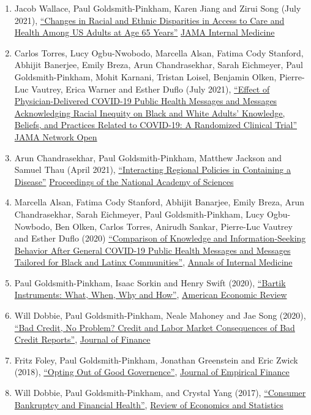\documentclass[letterpaper]{article}
\begin{document}
\begin{enumerate}
\item Jacob Wallace, Paul Goldsmith-Pinkham, Karen Jiang and Zirui Song (July 2021), \href{https://jamanetwork.com/journals/jamainternalmedicine/article-abstract/2782345}{``Changes in Racial and Ethnic Disparities in Access to Care and Health Among US Adults at Age 65 Years''} \ul{JAMA Internal Medicine}
\item Carlos Torres, Lucy Ogbu-Nwobodo, Marcella Alsan, Fatima Cody Stanford, Abhijit Banerjee, Emily Breza, Arun Chandrasekhar, Sarah Eichmeyer, Paul Goldsmith-Pinkham, Mohit Karnani, Tristan Loisel, Benjamin Olken, Pierre-Luc Vautrey, Erica Warner and Esther Duflo (July 2021), \href{https://jamanetwork.com/journals/jamanetworkopen/fullarticle/2781934}{``Effect of Physician-Delivered COVID-19 Public Health Messages and Messages Acknowledging Racial Inequity on Black and White Adults’ Knowledge, Beliefs, and Practices Related to COVID-19: A Randomized Clinical Trial''} \ul{JAMA Network Open}
\item Arun Chandrasekhar, Paul Goldsmith-Pinkham, Matthew Jackson and Samuel Thau (April 2021), \href{https://arxiv.org/abs/2008.10745}{``Interacting Regional Policies in Containing a Disease''} \ul{Proceedings of the National Academy of Sciences}
\item Marcella Alsan, Fatima Cody Stanford, Abhijit Banarjee, Emily Breza, Arun Chandrasekhar, Sarah Eichmeyer, Paul Goldsmith-Pinkham, Lucy Ogbu-Nowbodo, Ben Olken, Carlos Torres, Anirudh Sankar, Pierre-Luc Vautrey and Esther Duflo (2020) \href{https://www.acpjournals.org/doi/10.7326/M20-6141}{``Comparison of Knowledge and Information-Seeking Behavior After General COVID-19 Public Health Messages and Messages Tailored for Black and Latinx Communities''}, \ul{Annals of Internal Medicine}
\item Paul Goldsmith-Pinkham, Isaac Sorkin and Henry Swift (2020), \href{http://paulgp.github.io/papers/bartik_gpss.pdf}{``Bartik Instruments: What, When, Why and How''}, \ul{American Economic Review}
\item Will Dobbie, Paul Goldsmith-Pinkham, Neale Mahoney and Jae Song (2020), \href{https://papers.ssrn.com/sol3/papers.cfm?abstract_id=2844316}{``Bad Credit, No Problem? Credit and Labor Market Consequences of Bad Credit Reports''}, \ul{Journal of Finance}
\item Fritz Foley, Paul Goldsmith-Pinkham, Jonathan Greenstein and Eric Zwick (2018), \href{http://www.nber.org/papers/w19953}{``Opting Out of Good Governence''}, \ul{Journal of Empirical Finance}
\item Will Dobbie, Paul Goldsmith-Pinkham, and Crystal Yang (2017), \href{http://www.nber.org/papers/w21032}{``Consumer Bankruptcy and Financial Health''}, \ul{Review of Economics and Statistics}

\end{enumerate}
\end{document}
